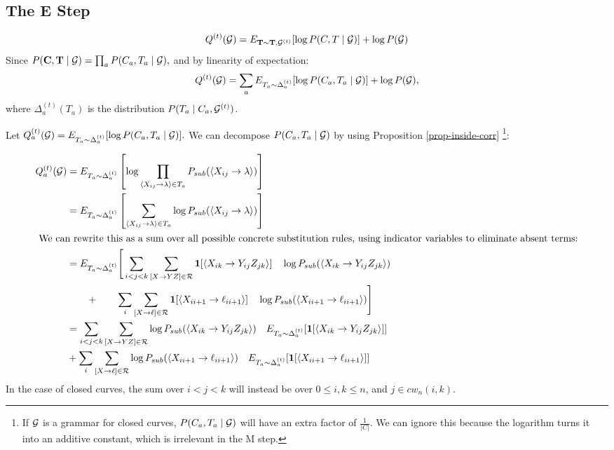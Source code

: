 \subsection{The E Step}

$$Q^{(t)}({\mathcal G}) = E_{\mathbf{T}\sim \mathbf{T}, {\mathcal G}^{(t)}} [\log
P(C,T\mid {\mathcal G})] + \log P({\mathcal G})$$
Since $P(\mathbf{C},\mathbf{T}\mid {\mathcal G}) = \prod_a P(C_a, T_a\mid {\mathcal G}),$
and by linearity of expectation:
$$Q^{(t)}({\mathcal G}) = \sum_a E_{T_a\sim \Delta^{(t)}_a} [\log
P(C_a,T_a \mid {\mathcal G})] + \log P({\mathcal G}),$$
where $\Delta^{(t)}_a(T_a)$ is the distribution $P(T_a\mid C_a,
{\mathcal G}^{(t)})$.

Let $Q_a^{(t)}({\mathcal G}) =E_{T_a \sim \Delta_a^{(t)}}[\log P(C_a,T_a\mid
{\mathcal G})].$ We can decompose $P(C_a, T_a\mid {\mathcal G})$ by using Proposition
\ref{prop-inside-corr} \footnote{If ${\mathcal G}$ is a grammar for closed curves,
  $P(C_a,T_a\mid {\mathcal G})$ will have an extra factor of
  $\frac{1}{|C|}$. We can ignore this because the logarithm turns it
  into an additive constant, which is irrelevant in the M step.}:

\begin{align*}
  Q_a^{(t)}({\mathcal G}) &=
E_{T_a \sim \Delta_a^{(t)}}\left[\log
    \prod_{\langle X_{ij} \to \lambda\rangle \in T_a} P_{sub}(\langle
    X_{ij} \to \lambda\rangle)\right]\\
&=
E_{T_a \sim \Delta_a^{(t)}}\left[
    \sum_{\langle X_{ij} \to \lambda\rangle \in T_a} \log P_{sub}(\langle
    X_{ij} \to \lambda\rangle)\right]\\
\intertext{
We can rewrite this as a sum over all possible concrete
  substitution rules, using indicator variables to eliminate absent terms:}
&=
E_{T_a \sim \Delta_a^{(t)}}\Bigg[
\sum_{i < j < k} \sum_{[X\to YZ]\in {\mathcal R}}\mathbf{1} [ 
\langle X_{ik}
\to Y_{ij} Z_{jk} \rangle] \quad \log P_{sub}(\langle X_{ik} \to Y_{ij}
Z_{jk}\rangle )\\
&\qquad+\qquad \sum_{i} \sum_{[X\to \ell]\in {\mathcal R}}\mathbf{1} [ \langle X_{i i+1}
\to \ell_{i i+1} \rangle] \quad \log P_{sub}(\langle X_{i i+1} \to \ell_{i i+1}\rangle)
\Bigg]\\
&=
\sum_{i < j < k} \sum_{[X\to YZ]\in {\mathcal R}} \log P_{sub}(\langle X_{ik} \to Y_{ij}
Z_{jk}\rangle ) \quad E_{T_a \sim \Delta_a^{(t)}}[\mathbf{1} [ 
\langle X_{ik}
\to Y_{ij} Z_{jk} \rangle]]\\
&+ \sum_{i} \sum_{[X\to \ell]\in {\mathcal R}}
\log P_{sub}(\langle X_{i i+1} \to \ell_{i i+1}\rangle)
\quad E_{T_a \sim \Delta_a^{(t)}}[\mathbf{1} [ \langle X_{i i+1}
\to \ell_{i i+1} \rangle]] 
\end{align*}
In the case of closed curves, the sum over $i < j < k$ will instead be
over $0\le i,k \le n$, and $j\in cw_n(i,k)$.

